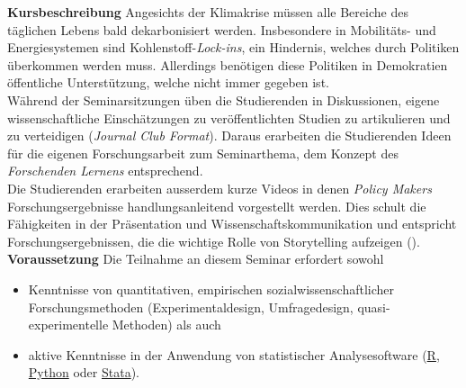 \documentclass[12pt,a4paper]{article}
\begin{document}
\noindent\textbf{Kursbeschreibung} 
Angesichts der Klimakrise müssen alle Bereiche des täglichen Lebens bald dekarbonisiert werden. Insbesondere in Mobilitäts- und Energiesystemen sind Kohlenstoff-\textit{Lock-ins}, ein Hindernis, welches durch Politiken überkommen werden muss. Allerdings benötigen diese Politiken in Demokratien öffentliche Unterstützung, welche nicht immer gegeben ist.\\ 
Während der Seminarsitzungen üben die Studierenden in Diskussionen, eigene wissenschaftliche Einschätzungen zu veröffentlichten Studien zu artikulieren und zu verteidigen (\textit{Journal Club Format}). Daraus erarbeiten die Studierenden Ideen für die eigenen Forschungsarbeit zum Seminarthema, dem Konzept des \textit{Forschenden Lernens} entsprechend.\\
Die Studierenden erarbeiten ausserdem kurze Videos in denen \textit{Policy Makers} Forschungsergebnisse handlungsanleitend vorgestellt werden. Dies schult die Fähigkeiten in der Präsentation und Wissenschaftskommunikation und entspricht Forschungsergebnissen, die die wichtige Rolle von Storytelling aufzeigen (\cite{Graeber2024,Zabel2025}).\\ 

\medskip
\noindent\textbf{Voraussetzung} Die Teilnahme an diesem Seminar erfordert sowohl

\begin{itemize}
\item Kenntnisse von quantitativen, empirischen sozialwissenschaftlicher Forschungsmethoden (Experimentaldesign, Umfragedesign, quasi-experimentelle Methoden) als auch
    \item aktive Kenntnisse in der Anwendung von statistischer Analysesoftware (\href{https://www.r-project.org/}{R}, \href{https://www.python.org/}{Python} oder \href{https://www.stata.com/}{Stata}).
\end{itemize}
\end{document}
